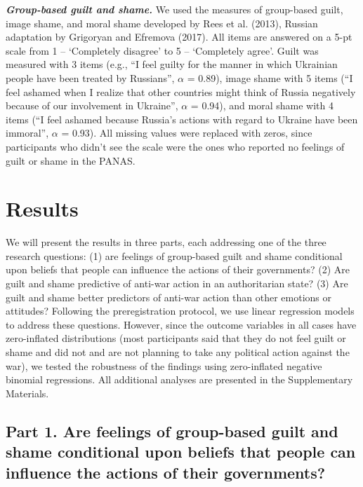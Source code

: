 \documentclass[
]{article}
\begin{document}
\textbf{\emph{Group-based guilt and shame.}} We used the measures of group-based guilt, image shame, and moral shame developed by Rees et al. (2013), Russian adaptation by Grigoryan and Efremova (2017). All items are answered on a 5-pt scale from 1 -- `Completely disagree' to 5 -- `Completely agree'. Guilt was measured with 3 items (e.g., ``I feel guilty for the manner in which Ukrainian people have been treated by Russians'', \(\alpha\) = 0.89), image shame with 5 items (``I feel ashamed when I realize that other countries might think of Russia negatively because of our involvement in Ukraine'', \(\alpha\) = 0.94), and moral shame with 4 items (``I feel ashamed because Russia's actions with regard to Ukraine have been immoral'', \(\alpha\) = 0.93). All missing values were replaced with zeros, since participants who didn't see the scale were the ones who reported no feelings of guilt or shame in the PANAS.

\allsectionsfont{\centering}

\hypertarget{results}{%
\section*{Results}\label{results}}

We will present the results in three parts, each addressing one of the three research questions: (1) are feelings of group-based guilt and shame conditional upon beliefs that people can influence the actions of their governments? (2) Are guilt and shame predictive of anti-war action in an authoritarian state? (3) Are guilt and shame better predictors of anti-war action than other emotions or attitudes? Following the preregistration protocol, we use linear regression models to address these questions. However, since the outcome variables in all cases have zero-inflated distributions (most participants said that they do not feel guilt or shame and did not and are not planning to take any political action against the war), we tested the robustness of the findings using zero-inflated negative binomial regressions. All additional analyses are presented in the Supplementary Materials.

\allsectionsfont{\raggedright}

\hypertarget{part-1.-are-feelings-of-group-based-guilt-and-shame-conditional-upon-beliefs-that-people-can-influence-the-actions-of-their-governments}{%
\subsection*{Part 1. Are feelings of group-based guilt and shame conditional upon beliefs that people can influence the actions of their governments?}\label{part-1.-are-feelings-of-group-based-guilt-and-shame-conditional-upon-beliefs-that-people-can-influence-the-actions-of-their-governments}}
\end{document}
